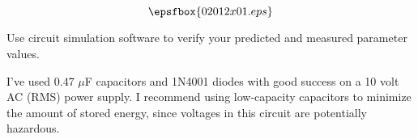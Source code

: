 

$$\epsfbox{02012x01.eps}$$

\vfil \eject






Use circuit simulation software to verify your predicted and measured parameter values.







I've used 0.47 $\mu$F capacitors and 1N4001 diodes with good success on a 10 volt AC (RMS) power supply.  I recommend using low-capacity capacitors to minimize the amount of stored energy, since voltages in this circuit are potentially hazardous.




